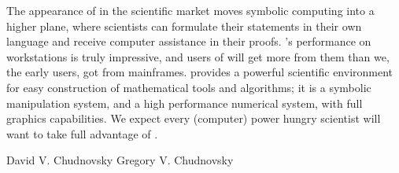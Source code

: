 The appearance of \Language{} in the scientific market moves
symbolic computing into a higher plane, where scientists can
formulate their statements in their own language and receive
computer assistance in their proofs.
\Language{}'s performance on workstations is truly impressive, and
users of \Language{} will get more from them than we, the early
users, got from mainframes.
\Language{} provides a powerful scientific environment for easy
construction of mathematical tools and algorithms; it is a
symbolic manipulation system, and a high performance numerical
system, with full graphics capabilities.
We expect every (computer) power hungry scientist will want to
take full advantage of \Language{}.

\noindent
David V. Chudnovsky  \hfill             Gregory V. Chudnovsky
